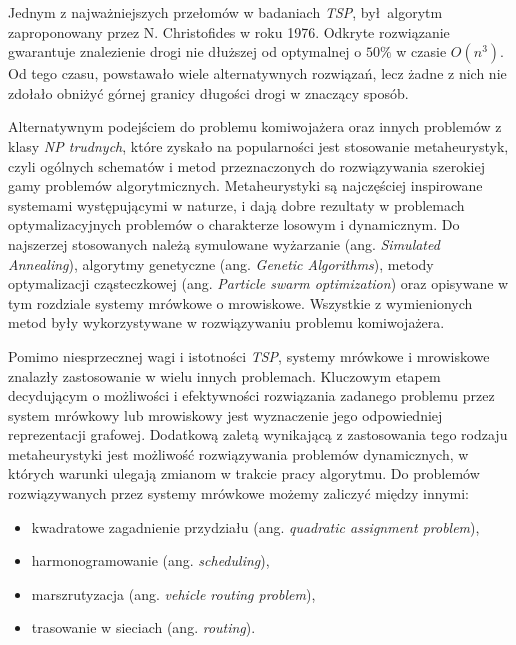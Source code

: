 {{        Jednym z najważniejszych przełomów w badaniach \textit{TSP}, był algorytm zaproponowany przez N. Christofides w
        roku 1976. Odkryte rozwiązanie gwarantuje znalezienie drogi nie dłuższej od optymalnej o $50\%$ w czasie
        $O(n^3)$\cite{Christofides1976WorstCaseAO}. Od tego czasu, powstawało wiele alternatywnych rozwiązań, lecz żadne
        z nich nie zdołało obniżyć górnej granicy długości drogi w znaczący sposób.

        Alternatywnym podejściem do problemu komiwojażera oraz innych problemów z klasy \textit{NP trudnych}, które
        zyskało na popularności jest stosowanie metaheurystyk, czyli ogólnych schematów i metod przeznaczonych do
        rozwiązywania szerokiej gamy problemów algorytmicznych. Metaheurystyki są najczęściej inspirowane systemami
        występującymi w naturze, i dają dobre rezultaty w problemach optymalizacyjnych problemów o charakterze losowym i
        dynamicznym\cite{Bianchi2008ASO}. Do najszerzej stosowanych należą symulowane wyżarzanie (ang. \textit{Simulated
        Annealing})\cite{Kirkpatrick1983OptimizationBS}, algorytmy genetyczne (ang. \textit{Genetic
        Algorithms})\cite{Fraser1957SimulationOG}, metody optymalizacji cząsteczkowej (ang. \textit{Particle swarm
        optimization})\cite{Poli2007ParticleSO} oraz opisywane w tym rozdziale systemy mrówkowe o mrowiskowe. Wszystkie
        z wymienionych metod były wykorzystywane w rozwiązywaniu problemu komiwojażera\cite{Prabakaran2019ASO,
        Mazidi2017MetaHeuristicAF}.

        Pomimo niesprzecznej wagi i istotności \textit{TSP}, systemy mrówkowe i mrowiskowe znalazły zastosowanie w wielu
        innych problemach. Kluczowym etapem decydującym o możliwości i efektywności rozwiązania zadanego problemu przez
        system mrówkowy lub mrowiskowy jest wyznaczenie jego odpowiedniej reprezentacji grafowej\cite{Dorigo1991AntSA}.
        Dodatkową zaletą wynikającą z zastosowania tego rodzaju metaheurystyki jest możliwość rozwiązywania problemów
        dynamicznych, w których warunki ulegają zmianom w trakcie pracy algorytmu. Do problemów rozwiązywanych przez
        systemy mrówkowe możemy zaliczyć między innymi:

        \begin{itemize}
            \item kwadratowe zagadnienie przydziału (ang. \textit{quadratic assignment problem})\cite{Maniezzo1999TheAS,
            Gambardella1999AntCF},
            \item harmonogramowanie (ang. \textit{scheduling})\cite{JSSchedulingColoroni94, Merkle2002AntCO},
            \item marszrutyzacja (ang. \textit{vehicle routing problem})\cite{Bullnheimer1999ApplyingTA},
            \item trasowanie w sieciach (ang. \textit{routing})\cite{Caro1999AntNetAM, Bonabeau1998RoutingIT}.
        \end{itemize}
    }

}
